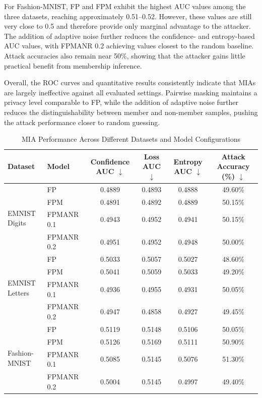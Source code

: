 \documentclass[a4paper,fleqn]{cas-dc}
\begin{document}
For Fashion-MNIST, FP and FPM exhibit the highest AUC values among the three datasets, reaching approximately 0.51--0.52. However, these values are still very close to 0.5 and therefore provide only marginal advantage to the attacker. The addition of adaptive noise further reduces the confidence- and entropy-based AUC values, with FPMANR 0.2 achieving values closest to the random baseline. Attack accuracies also remain near 50\%, showing that the attacker gains little practical benefit from membership inference.

Overall, the ROC curves and quantitative results consistently indicate that MIAs are largely ineffective against all evaluated settings. Pairwise masking maintains a privacy level comparable to FP, while the addition of adaptive noise further reduces the distinguishability between member and non-member samples, pushing the attack performance closer to random guessing.

\begin{table}
\centering
\scriptsize
\caption{MIA Performance Across Different Datasets and Model Configurations}
\label{tab:2}
\begin{tabular}{l l c c c c}
\toprule
\textbf{Dataset} & \textbf{Model} & \textbf{Confidence AUC $\downarrow$} & \textbf{Loss AUC $\downarrow$} & \textbf{Entropy AUC $\downarrow$} & \textbf{Attack Accuracy (\%) $\downarrow$} \\
\midrule
\multirow{4}{*}{EMNIST Digits} & FP & 0.4889 & 0.4893 & 0.4888 & 49.60\% \\
 & FPM & 0.4891 & 0.4892 & 0.4889 & 50.15\% \\
 & FPMANR 0.1 & 0.4943 & 0.4952 & 0.4941 & 50.15\% \\
 & FPMANR 0.2 & 0.4951 & 0.4952 & 0.4948 & 50.00\% \\
\midrule
\multirow{4}{*}{EMNIST Letters} & FP & 0.5033 & 0.5057 & 0.5027 & 48.60\% \\
 & FPM & 0.5041 & 0.5059 & 0.5033 & 49.20\% \\
 & FPMANR 0.1 & 0.4936 & 0.4955 & 0.4931 & 50.05\% \\
 & FPMANR 0.2 & 0.4947 & 0.4858 & 0.4927 & 49.45\% \\
\midrule
\multirow{4}{*}{Fashion-MNIST} & FP & 0.5119 & 0.5148 & 0.5106 & 50.05\% \\
 & FPM & 0.5126 & 0.5169 & 0.5111 & 50.90\% \\
 & FPMANR 0.1 & 0.5085 & 0.5145 & 0.5076 & 51.30\% \\
 & FPMANR 0.2 & 0.5004 & 0.5145 & 0.4997 & 49.40\% \\
\bottomrule
\end{tabular}
\end{table}
\end{document}
